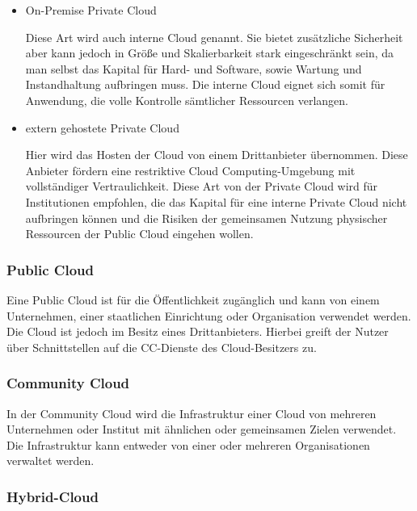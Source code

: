 \begin{itemize}
    \item On-Premise Private Cloud
    \begin{sloppypar}
        Diese Art wird auch interne Cloud genannt. Sie bietet zusätzliche Sicherheit aber kann jedoch in Größe und Skalierbarkeit stark eingeschränkt sein, da man selbst das Kapital für Hard- und Software, sowie Wartung und Instandhaltung aufbringen muss. Die interne Cloud eignet sich somit für Anwendung, die volle Kontrolle sämtlicher Ressourcen verlangen.
    \end{sloppypar}
    \item extern gehostete Private Cloud
    \begin{sloppypar} 
        Hier wird das Hosten der Cloud von einem Drittanbieter übernommen. Diese Anbieter fördern eine restriktive Cloud Computing-Umgebung mit vollständiger Vertraulichkeit. Diese Art von der Private Cloud wird für Institutionen empfohlen, die das Kapital für eine interne Private Cloud nicht aufbringen können und die Risiken der gemeinsamen Nutzung physischer Ressourcen der Public Cloud eingehen wollen.   
    \end{sloppypar} 
\end{itemize}

\subsubsection{Public Cloud}

Eine Public Cloud ist für die Öffentlichkeit zugänglich und kann von einem Unternehmen, einer staatlichen Einrichtung oder Organisation verwendet werden. Die Cloud ist jedoch im Besitz eines Drittanbieters. Hierbei greift der Nutzer über Schnittstellen auf die CC-Dienste des Cloud-Besitzers zu.

\subsubsection{Community Cloud}

In der Community Cloud wird die Infrastruktur einer Cloud von mehreren Unternehmen oder Institut mit ähnlichen oder gemeinsamen Zielen verwendet. Die Infrastruktur kann entweder von einer oder mehreren Organisationen verwaltet werden.

\subsubsection{Hybrid-Cloud}

